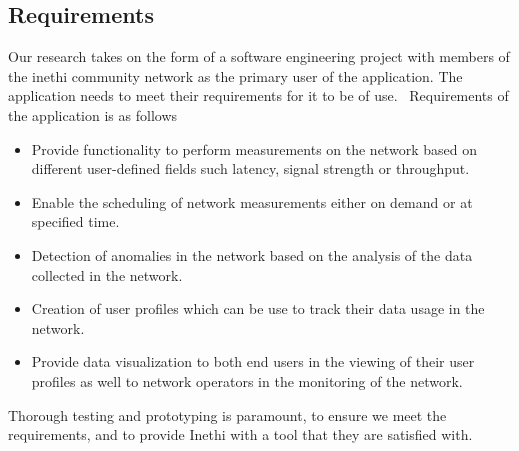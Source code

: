 \subsection{Requirements}
Our research takes on the form of a software engineering project with members of the inethi community network as the primary user of the application. The application needs to meet their requirements for it to be of use.
\
Requirements of the application is as follows 
\begin{itemize}
	\item Provide functionality to perform measurements on the network based on different user-defined fields such latency, signal strength or throughput.
	
	\item Enable the scheduling of network measurements either on demand or at specified time.  
	
	\item Detection of anomalies in the network based on the analysis of the data collected in the network.
	
	\item Creation of user profiles which can be use to track their data usage in the network. 
	
	\item Provide data visualization to both end users in the viewing of their user profiles as well to network operators in the monitoring of the network.
\end{itemize}
Thorough testing and prototyping is paramount, to ensure we meet the requirements, and to provide Inethi with a tool that they are satisfied with.
